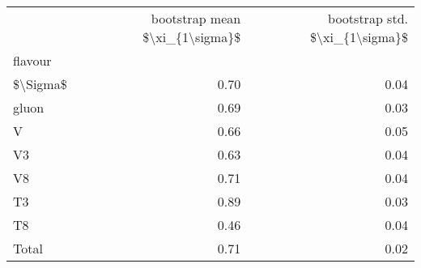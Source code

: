 \begin{tabular}{lrr}
\toprule
{} &  bootstrap mean \$\textbackslash xi\_\{1\textbackslash sigma\}\$ &  bootstrap std. \$\textbackslash xi\_\{1\textbackslash sigma\}\$ \\
flavour  &                                 &                                 \\
\midrule
\$\textbackslash Sigma\$ &                            0.70 &                            0.04 \\
gluon    &                            0.69 &                            0.03 \\
V        &                            0.66 &                            0.05 \\
V3       &                            0.63 &                            0.04 \\
V8       &                            0.71 &                            0.04 \\
T3       &                            0.89 &                            0.03 \\
T8       &                            0.46 &                            0.04 \\
Total    &                            0.71 &                            0.02 \\
\bottomrule
\end{tabular}
